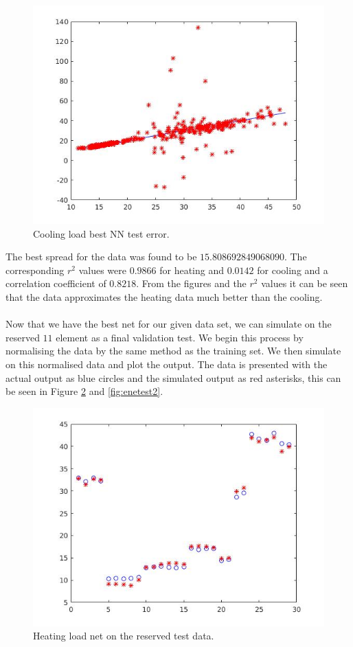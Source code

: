 \documentclass{article}%
\begin{document}
\begin{figure}[H]
\centering
\includegraphics[scale=0.5]{Images/enetrain2.jpg}
\caption{Cooling load best NN test error.}
\label{fig:enetrain2}
\end{figure}
The best spread for the data was found to be $15.808692849068090$. The corresponding $r^2$ values were $0.9866$ for heating and $0.0142$ for cooling and a correlation coefficient of $0.8218$. From the figures and the $r^2$ values it can be seen that the data approximates the heating data much better than the cooling.
\\
\\
Now that we have the best net for our given data set, we can simulate on the reserved $11$ element as a final validation test. We begin this process by normalising the data by the same method as the training set. We then simulate on this normalised data and plot the output. The data is presented with the actual output as blue circles and the simulated output as red asterisks, this can be seen in Figure \ref{fig:enetest1} and \ref{fig:enetest2}.
\begin{figure}[H]
\centering
\includegraphics[scale=0.5]{Images/enetest1.jpg}
\caption{Heating load net on the reserved test data.}
\label{fig:enetest1}
\end{figure}
\end{document}
